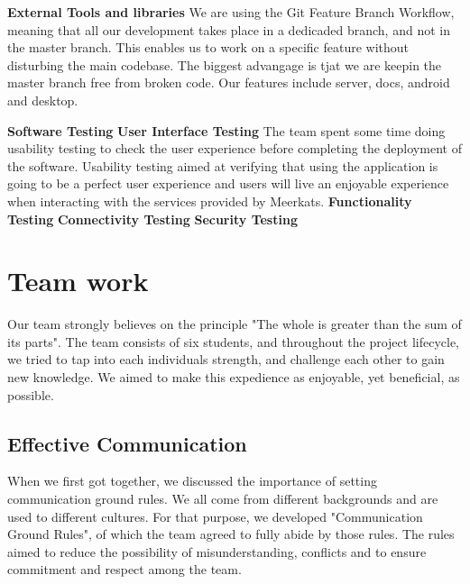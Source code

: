 \documentclass{article}
\begin{document}
\textbf{External Tools and libraries}
We are using the Git Feature Branch Workflow, meaning that all our development takes place in a dedicaded branch, and not in the master branch. This enables us to work on a specific feature without disturbing the main codebase. The biggest advangage is tjat we are keepin the master branch free from broken code. Our features include server, docs, android and desktop. 

\textbf{Software Testing}
\textbf{User Interface Testing}
The team spent some time doing usability testing to check the user experience before completing the deployment of the software. Usability testing aimed at verifying that using the application is going to be a perfect user experience and users will live an enjoyable experience when interacting with the services provided by Meerkats.
\newline
\hfill \break
\textbf{Functionality Testing}
\newline
\hfill \break
\textbf{Connectivity Testing}
\newline
\hfill \break
\textbf{Security Testing}


\section{Team work}
Our team strongly believes on the principle "The whole is greater than the sum of its parts". The team consists of six students, and throughout the project lifecycle, we tried to tap into each individuals strength, and challenge each other to gain new knowledge. We aimed to make this expedience as enjoyable, yet beneficial, as possible.

\subsection{Effective Communication}
When we first got together, we discussed the importance of setting communication ground rules. We all come from different backgrounds and are used to different cultures. For that purpose, we developed "Communication Ground Rules", of which the team agreed to fully abide by those rules. The rules aimed to reduce the possibility of misunderstanding, conflicts and to ensure commitment and respect among the team.
\end{document}
